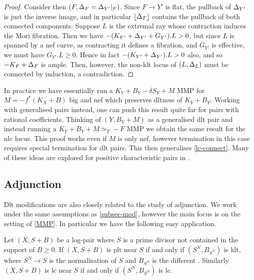 \begin{proof}
	Consider then $(F,\Delta_{F}=\Delta_{Y'}|_{F})$. Since $F \to Y'$ is flat, the pullback of $\Delta_{Y'}$ is just the inverse image, and in particular $\lfloor \Delta_{T} \rfloor$ contains the pullback of both connected components. Suppose $L$ is the extremal ray whose contraction induces the Mori fibration. Then we have $-(K_{Y'}+\Delta_{Y'}+G_{Y'}).L >0$, but since $L$ is spanned by a nef curve, as contracting it defines a fibration, and $G_{Y'}$ is effective, we must have $G_{Y'}.L \geq 0$. Hence in fact $-(K_{Y'}+\Delta_{Y'}).L >0$ also, and so $-K_{F}+\Delta_{F}$ is ample. Then, however, the non-klt locus of $(L,\Delta_{L})$ must be connected by induction, a contradiction.

\end{proof}


In practice we have essentially run a $K_{Y}+B_{Y}-\delta S_{Y}+ M$ MMP for $M=-f^{*}(K_{X}+B)$ big and nef which preserves dltness of $K_{Y}+B_{Y}$. Working with generalised pairs instead, one can push this result quite far for pairs with rational coefficients. Thinking of $(Y,B_{Y}+M)$ as a generalised dlt pair and instead running a $K_{Y}+B_{Y}+M\simeq_{T} -F$ MMP we obtain the same result for the nlc locus. This proof works even if $M$ is only nef, however termination in this case requires special termination for dlt pairs. This then generalises \autoref{lc-connect}.  Many of these ideas are explored for positive characteristic pairs in \cite{filipazzi2020connectedness}.


\subsection{Adjunction}

Dlt modifications are also closely related to the study of adjunction. We work under the same assumptions as \autoref{subsec-mod}, however the main focus is on the setting of \autoref{MMP}. 
In particular we have the following easy application.

\begin{theorem}\label{t-inv_adj}
	Let $(X,S+B)$ be a log-pair where $S$ is a prime divisor not contained in the support of $B \geq 0$. If $(X,S+B)$ is plt near $S$ if and only if $(S^{N},B_{S^{N}})$ is klt, where $S^{N} \to S$ is the normalisation of $S$ and $B_{S^{N}}$ is the different \cite[Definition 4.2]{kk-singbook}. Similarly $(X,S+B)$ is lc near $S$ if and only if $(S^{N},B_{S^{N}})$ is lc.
\end{theorem}

